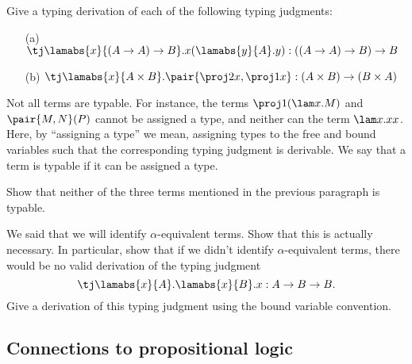 \documentclass[12pt]{article}
\begin{document}
\begin{exercise}
  Give a typing derivation of each of the following typing judgments:
  \begin{enumerate}
  \item[(a)] $\tj\lamabs{x}{(A\to A)\to B}.x(\lamabs{y}{A}.y):((A\to
    A)\to B)\to B$
  \item[(b)] $\tj\lamabs{x}{A\times B}.\pair{\proj2 x,\proj1
      x}:(A\times B)\to (B\times A)$
  \end{enumerate}
\end{exercise}

Not all terms are typable. For instance, the terms $\proj1(\lam x.M)$
and $\pair{M,N}(P)$ cannot be assigned a type, and neither can the
term $\lam x.xx$. Here, by ``assigning a type'' we mean, assigning
types to the free and bound variables such that the corresponding
typing judgment is derivable. We say that a term is typable if it can
be assigned a type.

\begin{exercise}
  Show that neither of the three terms mentioned in the previous paragraph
  is typable. 
\end{exercise}

\begin{exercise}
  We said that we will identify $\alpha$-equivalent terms. Show that
  this is actually necessary. In particular, show that if we didn't
  identify $\alpha$-equivalent terms, there would be no valid
  derivation of the typing judgment
  \[ \tj\lamabs{x}{A}.\lamabs{x}{B}.x:A\to B\to B. \]
  Give a derivation of this typing judgment using the bound variable
  convention.
\end{exercise}

\subsection{Connections to propositional logic}
\label{subsec-connprop}
\end{document}
